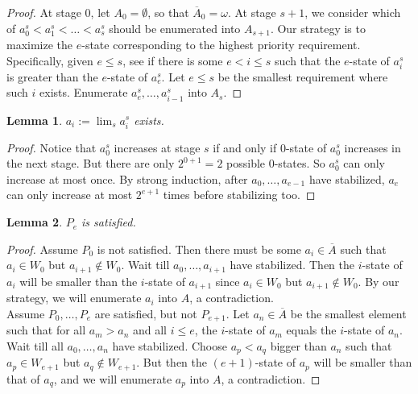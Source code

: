\documentclass{article}
\newtheorem{lemma}{Lemma}[subsection]
\begin{document}
  \begin{proof}
    At stage 0, let $A_0=\emptyset$, so that $\overline{A}_0=\omega$. At
    stage $s+1$, we consider which of $a_0^s<a_1^s<\ldots<a_s^s$ should be
    enumerated into $A_{s+1}$. Our strategy is to maximize the $e$-state
    corresponding to the highest priority requirement. Specifically, given
    $e\leq s$, see if there is some $e<i\leq s$ such that the $e$-state of
    $a_i^s$ is greater than the $e$-state of $a_e^s$. Let $e\leq s$ be the
    smallest requirement where such $i$ exists. Enumerate
    $a_e^s,\ldots,a_{i-1}^s$ into $A_s$.
  \end{proof}

  \begin{lemma}
    $a_i:=\lim_s a_i^s$ exists.
  \end{lemma}
  \begin{proof}
    Notice that $a_0^s$ increases at stage $s$ if and only if $0$-state of
    $a_0^s$ increases in the next stage. But there are only $2^{0+1}=2$
    possible $0$-states. So $a_0^s$ can only increase at most once. By
    strong induction, after $a_0,\ldots,a_{e-1}$ have stabilized, $a_e$
    can only increase at most $2^{e+1}$ times before stabilizing too.
  \end{proof}

  \begin{lemma}
    $P_e$ is satisfied.
  \end{lemma}
  \begin{proof}
    Assume $P_0$ is not satisfied. Then there must be some
    $a_i\in\overline{A}$ such that $a_i\in W_0$ but $a_{i+1}\not\in W_0$.
    Wait till $a_0,\ldots,a_{i+1}$ have stabilized. Then
    the $i$-state of $a_i$ will be smaller than the $i$-state of $a_{i+1}$
    since $a_i\in W_0$ but $a_{i+1}\not\in W_0$. By our strategy, we will
    enumerate $a_i$ into $A$, a contradiction. \\

    Assume $P_0,\ldots,P_e$ are satisfied, but not $P_{e+1}$. Let
    $a_n\in\overline{A}$ be the smallest element such that for all
    $a_m>a_n$ and all $i\leq e$, the $i$-state of $a_m$ equals the
    $i$-state of $a_n$. Wait till all $a_0,\ldots,a_n$ have stabilized.
    Choose $a_p<a_q$ bigger than $a_n$ such that $a_p\in W_{e+1}$ but
    $a_q\not\in W_{e+1}$. But then the $(e+1)$-state of $a_p$ will be
    smaller than that of $a_q$, and we will enumerate $a_p$ into $A$, a
    contradiction.
  \end{proof}
\end{document}
